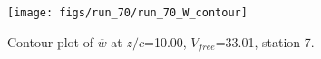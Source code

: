 \begin{figure}[H]
\centering
\texttt{[image: figs/run\_70/run\_70\_W\_contour]}
\caption{Contour plot of $\overline{w}$ at $z/c$=10.00, $V_{free}$=33.01, station 7.}
\end{figure}



